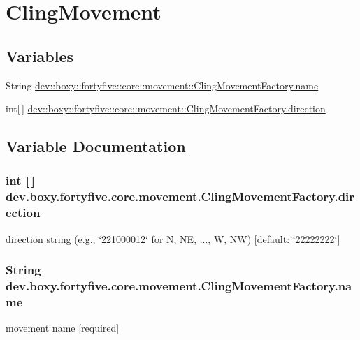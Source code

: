 \hypertarget{group___cling_movement}{
\section{ClingMovement}
\label{d3/dd8/group___cling_movement}
}
\subsection*{Variables}
\begin{DoxyCompactItemize}
\item 
String \hyperlink{group___cling_movement_gaa579f2e009783fee52786dbd2d9bb066}{dev::boxy::fortyfive::core::movement::ClingMovementFactory.name}
\item 
int\mbox{[}$\,$\mbox{]} \hyperlink{group___cling_movement_ga7b80960ec266700a327ef11aec88b852}{dev::boxy::fortyfive::core::movement::ClingMovementFactory.direction}
\end{DoxyCompactItemize}


\subsection{Variable Documentation}
\hypertarget{group___cling_movement_ga7b80960ec266700a327ef11aec88b852}{
\subsubsection[{direction}]{\setlength{\rightskip}{0pt plus 5cm}int \mbox{[}$\,$\mbox{]} {\bf dev.boxy.fortyfive.core.movement.ClingMovementFactory.direction}}}
\label{d3/dd8/group___cling_movement_ga7b80960ec266700a327ef11aec88b852}
direction string (e.g., \char`\"{}221000012\char`\"{} for N, NE, ..., W, NW) \mbox{[}default: \char`\"{}22222222\char`\"{}\mbox{]} \hypertarget{group___cling_movement_gaa579f2e009783fee52786dbd2d9bb066}{
\subsubsection[{name}]{\setlength{\rightskip}{0pt plus 5cm}String {\bf dev.boxy.fortyfive.core.movement.ClingMovementFactory.name}}}
\label{d3/dd8/group___cling_movement_gaa579f2e009783fee52786dbd2d9bb066}
movement name \mbox{[}required\mbox{]} 